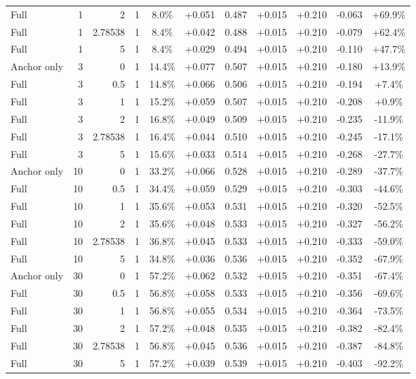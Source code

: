 \begin{table}[htbp]
\begin{tabular}{lrrrccccccc}
Full & 1 & 2 & 1 & 8.0\% & +0.051 & 0.487 & +0.015 & +0.210 & -0.063 & +69.9\% \\
Full & 1 & 2.78538 & 1 & 8.4\% & +0.042 & 0.488 & +0.015 & +0.210 & -0.079 & +62.4\% \\
Full & 1 & 5 & 1 & 8.4\% & +0.029 & 0.494 & +0.015 & +0.210 & -0.110 & +47.7\% \\
Anchor only & 3 & 0 & 1 & 14.4\% & +0.077 & 0.507 & +0.015 & +0.210 & -0.180 & +13.9\% \\
Full & 3 & 0.5 & 1 & 14.8\% & +0.066 & 0.506 & +0.015 & +0.210 & -0.194 & +7.4\% \\
Full & 3 & 1 & 1 & 15.2\% & +0.059 & 0.507 & +0.015 & +0.210 & -0.208 & +0.9\% \\
Full & 3 & 2 & 1 & 16.8\% & +0.049 & 0.509 & +0.015 & +0.210 & -0.235 & -11.9\% \\
Full & 3 & 2.78538 & 1 & 16.4\% & +0.044 & 0.510 & +0.015 & +0.210 & -0.245 & -17.1\% \\
Full & 3 & 5 & 1 & 15.6\% & +0.033 & 0.514 & +0.015 & +0.210 & -0.268 & -27.7\% \\
Anchor only & 10 & 0 & 1 & 33.2\% & +0.066 & 0.528 & +0.015 & +0.210 & -0.289 & -37.7\% \\
Full & 10 & 0.5 & 1 & 34.4\% & +0.059 & 0.529 & +0.015 & +0.210 & -0.303 & -44.6\% \\
Full & 10 & 1 & 1 & 35.6\% & +0.053 & 0.531 & +0.015 & +0.210 & -0.320 & -52.5\% \\
Full & 10 & 2 & 1 & 35.6\% & +0.048 & 0.533 & +0.015 & +0.210 & -0.327 & -56.2\% \\
Full & 10 & 2.78538 & 1 & 36.8\% & +0.045 & 0.533 & +0.015 & +0.210 & -0.333 & -59.0\% \\
Full & 10 & 5 & 1 & 34.8\% & +0.036 & 0.536 & +0.015 & +0.210 & -0.352 & -67.9\% \\
Anchor only & 30 & 0 & 1 & 57.2\% & +0.062 & 0.532 & +0.015 & +0.210 & -0.351 & -67.4\% \\
Full & 30 & 0.5 & 1 & 56.8\% & +0.058 & 0.533 & +0.015 & +0.210 & -0.356 & -69.6\% \\
Full & 30 & 1 & 1 & 56.8\% & +0.055 & 0.534 & +0.015 & +0.210 & -0.364 & -73.5\% \\
Full & 30 & 2 & 1 & 57.2\% & +0.048 & 0.535 & +0.015 & +0.210 & -0.382 & -82.4\% \\
Full & 30 & 2.78538 & 1 & 56.8\% & +0.045 & 0.536 & +0.015 & +0.210 & -0.387 & -84.8\% \\
Full & 30 & 5 & 1 & 57.2\% & +0.039 & 0.539 & +0.015 & +0.210 & -0.403 & -92.2\% \\

\end{tabular}
\end{table}

